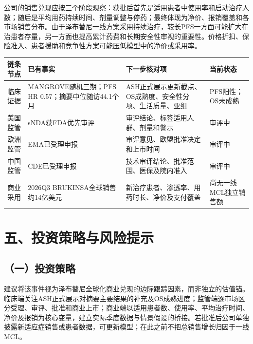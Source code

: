 \documentclass[a4paper,10pt,fontset=none]{ctexart}
\begin{document}
公司的销售兑现应按三个阶段观察：获批后首先是适用患者中使用率和启动治疗人数；随后是平均用药持续时间、剂量调整与停药；最终体现为净价、报销覆盖和各市场销售分布。由于泽布替尼一线方案采用持续治疗，较长PFS一方面可能扩大在治患者存量，另一方面也提高累计药费和长期安全性审视的重要性。价格折扣、保险准入、患者援助和竞争性方案可能压低模型中的净价或采用率。

\begin{center}\linespread{1.0}\selectfont
\begin{tabularx}{0.98\textwidth}{>{\centering\arraybackslash}p{1.8cm} X X >{\centering\arraybackslash}p{2cm}}
\toprule
链条节点 & 已有事实 & 下一步核对项 & 当前状态 \\
\midrule
临床证据 & MANGROVE随机三期；PFS HR 0.57；摘要中位随访44.1个月 & ASH正式展示更新截点、OS成熟度、安全性分项、生活质量、亚组 & PFS阳性；OS未成熟 \\
美国监管 & sNDA获FDA优先审评 & 审评结论、标签适用人群、剂量和警示 & 审评中 \\
欧洲监管 & EMA已受理申报 & 审评意见、欧盟批准决定和上市时间 & 审评中 \\
中国监管 & CDE已受理申报 & 技术审评结论、批准范围、医保及院内准入 & 审评中 \\
商业采用 & 2026Q3 BRUKINSA全球销售约14亿美元 & 新治疗患者、渗透率、用药时长、净价及支付覆盖 & 尚无一线MCL独立销售额 \\
\bottomrule
\end{tabularx}
\end{center}
\RUCTableAfterSpace

\clearpage
\section*{五、投资策略与风险提示}
\subsection*{（一）投资策略}
建议将该事件视为泽布替尼全球化商业兑现的边际跟踪因素，而非独立的估值锚。临床端关注ASH正式展示对摘要主要结果的补充及OS成熟进度；监管端逐市场区分受理、审评、批准和商业上市；商业端以适用患者数、使用率、平均治疗时间、净价及报销为核心变量，建立实际季度数据与情景假设的桥接。若批准后公司单独披露新适应症销售或患者数据，可更新模型；在此之前不把总销售增长归因于一线MCL。
\end{document}
